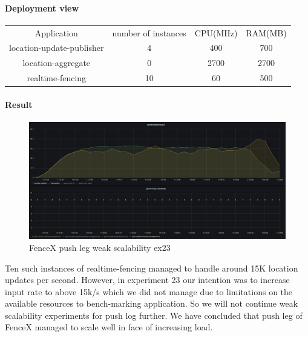 \documentclass[a4]{report}
\begin{document}
    \paragraph{Deployment view}
    \begin{center}
        \begin{tabular}{ c c c c }
            Application               & number of instances & CPU(MHz) & RAM(MB) \\
            location-update-publisher & 4                   & 400      & 700     \\
            location-aggregate        & 0                   & 2700     & 2700    \\
            realtime-fencing          & 10                  & 60       & 500     \\
        \end{tabular}
    \end{center}

    \paragraph{Result}
    \begin{figure}[ht]
        \caption{FenceX push leg weak scalability ex23}
        \label{fig:ex23}
        \includegraphics[scale=0.4]{images/evaluation/ex23-benchmarking-ongoing-2per2sec.png}
    \end{figure}
    Ten such instances of realtime-fencing managed to handle around 15K location updates per second.
    However, in experiment 23 our intention was to increase input rate to above 15k/s which we did not manage due to
    limitations on the available resources to bench-marking application.
    So we will not continue weak scalability experiments for push log further.
    We have concluded that push leg of FenceX managed to scale well in face of increasing load.
\end{document}

